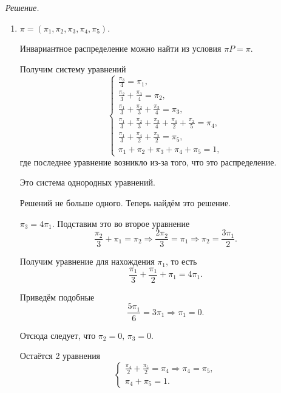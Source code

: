 \textit{Решение.}
\begin{enumerate}[label=\alph*)]
  \item $ \pi = \left( \pi_1, \pi_2, \pi_3, \pi_4, \pi_5 \right) $.

  Инвариантное распределение можно найти из условия $ \pi P = \pi $.

  Получим систему уравнений
  \begin{equation*}
    \begin{cases}
      \frac{ \pi_3}{4} = \pi_1, \\
      \frac{ \pi_2}{3} + \frac{ \pi_3}{4} = \pi_2, \\
      \frac{ \pi_1}{3} + \frac{ \pi_2}{3} + \frac{ \pi_3}{4} = \pi_3, \\
      \frac{ \pi_1}{3} + \frac{ \pi_2}{3} + \frac{ \pi_3}{4} + \frac{ \pi_4}{2} + \frac{ \pi_2}{5} =
      \pi_4, \\
      \frac{ \pi_1}{3} + \frac{ \pi_4}{2} + \frac{ \pi_5}{2} = \pi_5, \\
      \pi_1 + \pi_2 + \pi_3 + \pi_4 + \pi_5 = 1,
    \end{cases}
  \end{equation*}
  где последнее уравнение возникло из-за того, что это распределение.

  Это система однородных уравнений.

  Решений не больше одного.
  Теперь найдём это решение.

  $ \pi_3 = 4 \pi_1$.
  Подставим это во второе уравнение
  \begin{equation*}
    \frac{ \pi_2}{3} + \pi_1 = \pi_2 \Rightarrow
    \frac{2 \pi_2}{3} = \pi_1 \Rightarrow
    \pi_2 = \frac{3 \pi_1}{2}.
  \end{equation*}

  Получим уравнение для нахождения $ \pi_1$, то есть
  \begin{equation*}
    \frac{ \pi_1}{3} + \frac{ \pi_1}{2} + \pi_1 =
    4 \pi_1.
  \end{equation*}

  Приведём подобные
  \begin{equation*}
    \frac{5 \pi_1}{6} = 3 \pi_1 \Rightarrow \pi_1 = 0.
  \end{equation*}

  Отсюда следует, что $ \pi_2 = 0, \, \pi_3 = 0$.

  Остаётся 2 уравнения
  \begin{equation*}
    \begin{cases}
      \frac{ \pi_4}{2} + \frac{ \pi_5}{2} = \pi_4 \Rightarrow \pi_4 = \pi_5, \\
      \pi_4 + \pi_5 = 1.
    \end{cases}
  \end{equation*}


\end{enumerate}
